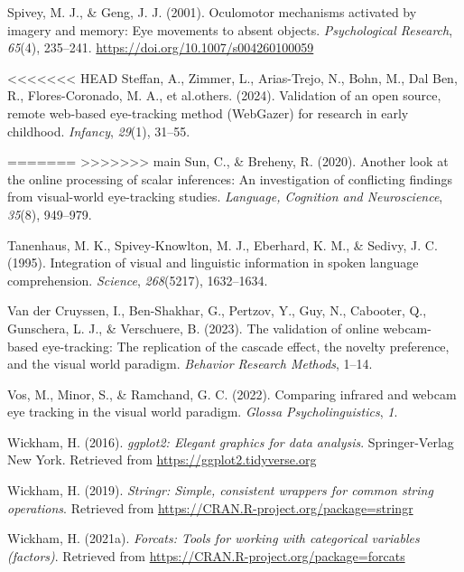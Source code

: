 \documentclass[
  man,floatsintext]{apa6}
\newlength{\cslhangindent}
\newenvironment{CSLReferences}[2] %
 {\begin{list}{}{%
  \setlength{\itemindent}{0pt}
  \setlength{\leftmargin}{0pt}
  \setlength{\parsep}{0pt}
  \ifodd #1
   \setlength{\leftmargin}{\cslhangindent}
   \setlength{\itemindent}{-1\cslhangindent}
  \fi
  \setlength{\itemsep}{#2\baselineskip}}}
 {\end{list}}
\begin{document}
\begin{CSLReferences}{1}{0}
Spivey, M. J., \& Geng, J. J. (2001). Oculomotor mechanisms activated by imagery and memory: Eye movements to absent objects. \emph{Psychological Research}, \emph{65}(4), 235--241. \url{https://doi.org/10.1007/s004260100059}

<<<<<<< HEAD
Steffan, A., Zimmer, L., Arias-Trejo, N., Bohn, M., Dal Ben, R., Flores-Coronado, M. A., et al.others. (2024). Validation of an open source, remote web-based eye-tracking method (WebGazer) for research in early childhood. \emph{Infancy}, \emph{29}(1), 31--55.

=======
>>>>>>> main
Sun, C., \& Breheny, R. (2020). Another look at the online processing of scalar inferences: An investigation of conflicting findings from visual-world eye-tracking studies. \emph{Language, Cognition and Neuroscience}, \emph{35}(8), 949--979.

Tanenhaus, M. K., Spivey-Knowlton, M. J., Eberhard, K. M., \& Sedivy, J. C. (1995). Integration of visual and linguistic information in spoken language comprehension. \emph{Science}, \emph{268}(5217), 1632--1634.

Van der Cruyssen, I., Ben-Shakhar, G., Pertzov, Y., Guy, N., Cabooter, Q., Gunschera, L. J., \& Verschuere, B. (2023). The validation of online webcam-based eye-tracking: The replication of the cascade effect, the novelty preference, and the visual world paradigm. \emph{Behavior Research Methods}, 1--14.

Vos, M., Minor, S., \& Ramchand, G. C. (2022). Comparing infrared and webcam eye tracking in the visual world paradigm. \emph{Glossa Psycholinguistics}, \emph{1}.

Wickham, H. (2016). \emph{ggplot2: Elegant graphics for data analysis}. Springer-Verlag New York. Retrieved from \url{https://ggplot2.tidyverse.org}

Wickham, H. (2019). \emph{Stringr: Simple, consistent wrappers for common string operations}. Retrieved from \url{https://CRAN.R-project.org/package=stringr}

Wickham, H. (2021a). \emph{Forcats: Tools for working with categorical variables (factors)}. Retrieved from \url{https://CRAN.R-project.org/package=forcats}


\end{CSLReferences}
\end{document}

